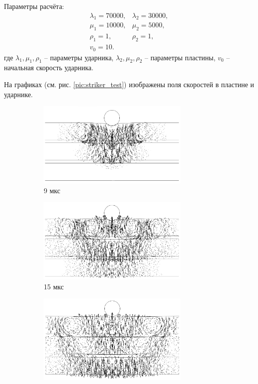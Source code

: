 Параметры расчёта:
\begin{eqnarray}
\lambda_1=70000, & \lambda_2=30000, \nonumber\\
\mu_1=10000, & \mu_2=5000, \nonumber\\
\rho_1=1, & \rho_2=1, \nonumber\\
v_0 = 10. &
\end{eqnarray}
где $\lambda_1, \mu_1, \rho_1$ -- параметры ударника, $\lambda_2, \mu_2, \rho_2$ -- параметры пластины, $v_0$ -- начальная скорость ударника.

На графиках (см. рис. \ref{pic:striker_test}) изображены поля скоростей в пластине и ударнике.

\clearpage
\newpage


\begin{figure}[ht]
\begin{subfigure}[b]{\textwidth}
\centering
\includegraphics[width=0.8\textwidth]{png/stounly-wave/01.png}
\caption{9 мкс}
\end{subfigure}
\begin{subfigure}[b]{\textwidth}
\centering
\includegraphics[width=0.8\textwidth]{png/stounly-wave/02.png}
\caption{15 мкс}
\end{subfigure}
\begin{subfigure}[b]{\textwidth}
\centering
\includegraphics[width=0.8\textwidth]{png/stounly-wave/03.png}

\end{subfigure}
\end{figure}
